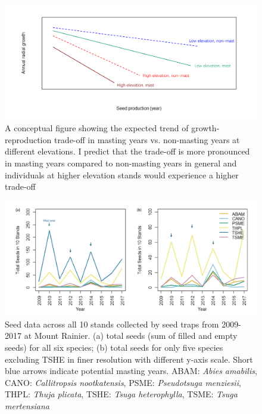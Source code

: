 \documentclass[11pt,letter]{article}
\begin{document}
\begin{figure}[htb]
	\centering
	\includegraphics[width=1\linewidth]{conceptualFigureChap2.png}
	\caption{A conceptual figure showing the expected trend of growth-reproduction trade-off in masting years vs. non-masting years at different elevations. I predict that the trade-off is more pronounced in masting years compared to non-masting years in general and individuals at higher elevation stands would experience a higher trade-off}
	\label{fig:conceptual2}
\end{figure}
\begin{figure}[htb]
	\centering
	\includegraphics[width=1\linewidth]{Seed1.jpg}
	\caption{Seed data across all 10 stands collected by seed traps from 2009-2017 at Mount Rainier. (a) total seeds (sum of filled and empty seeds) for all six species; (b) total seeds for only five species excluding TSHE in finer resolution with different y-axis scale. Short blue arrows indicate potential masting years. ABAM: \textit{Abies amabilis}, CANO:  \textit{Callitropsis nootkatensis}, PSME: \textit{Pseudotsuga menziesii}, THPL: \textit{Thuja plicata}, TSHE: \textit{Tsuga heterophylla}, TSME: \textit{Tsuga mertensiana}}
	\label{fig:seed}
\end{figure}
\end{document}

